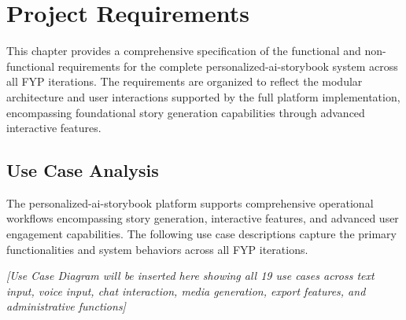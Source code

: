 \chapter{Project Requirements}
\label{sec:requirements}
This chapter provides a comprehensive specification of the functional and non-functional requirements for the complete personalized-ai-storybook system across all FYP iterations. The requirements are organized to reflect the modular architecture and user interactions supported by the full platform implementation, encompassing foundational story generation capabilities through advanced interactive features.

\section{Use Case Analysis}
The personalized-ai-storybook platform supports comprehensive operational workflows encompassing story generation, interactive features, and advanced user engagement capabilities. The following use case descriptions capture the primary functionalities and system behaviors across all FYP iterations.

\vspace{3cm}
\begin{center}
\textit{[Use Case Diagram will be inserted here showing all 19 use cases across text input, voice input, chat interaction, media generation, export features, and administrative functions]}
\end{center}
\vspace{2cm}

